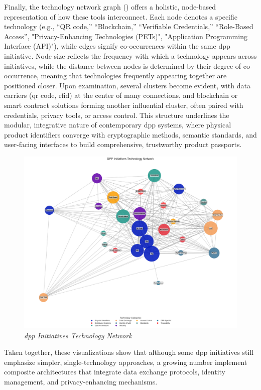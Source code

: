 Finally, the technology network graph () offers a holistic, node-based representation of how these tools interconnect. Each node denotes a specific technology (e.g., “QR code,” “Blockchain,” “Verifiable Credentials,” “Role-Based Access”, "Privacy-Enhancing Technologies (PETs)", "Application Programming Interface (API)"), while edges signify co-occurrences within the same \ac{dpp} initiative. Node size reflects the frequency with which a technology appears across initiatives, while the distance between nodes is determined by their degree of co-occurrence, meaning that technologies frequently appearing together are positioned closer. Upon examination, several clusters become evident, with data carriers (\ac{qr} code, \ac{rfid}) at the center of many connections, and blockchain or smart contract solutions forming another influential cluster, often paired with credentials, privacy tools, or access control. This structure underlines the modular, integrative nature of contemporary \ac{dpp} systems, where physical product identifiers converge with cryptographic methods, semantic standards, and user-facing interfaces to build comprehensive, trustworthy product passports.

\begin{figure}[!ht]
  \centering
  \includegraphics[width=\textwidth]{figures/initiatives_tech_network.png}
  \caption{%
    \textit{\ac{dpp} Initiatives Technology Network} 
  }
  \label{fig:initiatives_tech_network}
\end{figure}

Taken together, these visualizations show that although some \ac{dpp} initiatives still emphasize simpler, single-technology approaches, a growing number implement composite architectures that integrate data exchange protocols, identity management, and privacy-enhancing mechanisms.

